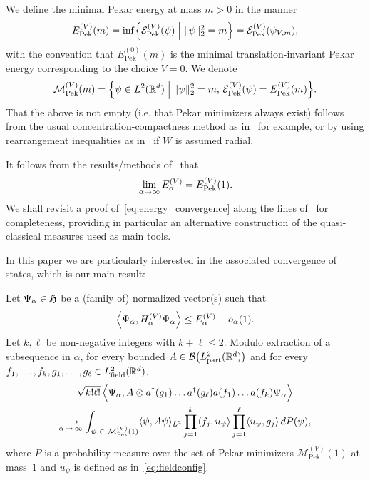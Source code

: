 \documentclass[AHL,Unicode,longabstracts,published]{cedram}
\DeclareMathOperator{\Pek}{Pek}
\DeclareMathOperator{\partt}{part}
\DeclareMathOperator{\field}{field}
\newcommand{\R}{\mathbb{R}}
\newcommand{\gH}{\mathfrak{H}}
\newcommand{\cB}{\mathcal{B}}
\newcommand{\cE}{\mathcal{E}}
\newcommand{\cM}{\mathcal{M}}
\newcommand{\1}{\mathds{1}}
\let\oldin\in
\renewcommand{\in}{\mathchoice{\oldin}{\oldin}{\,\oldin\,}{\,\oldin\,}}
\renewcommand*{\to}{\mathchoice{\longrightarrow}{\rightarrow}{\rightarrow}{\rightarrow}}
\let\originalleft\left
\let\originalright\right
\renewcommand{\left}{\mathopen{}\mathclose\bgroup\originalleft}
\renewcommand{\right}{\aftergroup\egroup\originalright}
\begin{document}
We define the minimal Pekar energy at mass $m >0$ in the manner
\begin{equation}\label{eq:pekar_energy}
E_{\Pek}^{(V)}(m)=\inf\left\{ \cE^{(V)}_{\Pek}(\psi)\;\middle|\;\|\psi\|_{2}^2=m \right\} = \cE_{\Pek}^{(V)}\left(\psi_{V,m} \right),
\end{equation}
with the convention that $E_{\Pek}^{(0)}(m)$ is the minimal translation-invariant Pekar energy corresponding to the choice $V=0$. We denote
\begin{equation}\label{eq:minimizers}
\cM _{\Pek}^{(V)}(m) = \left\{\psi\in L^2 (\R^d)\;\middle|\; \|\psi\|_{2}^2=m,\, \cE_{\Pek}^{(V)}\left(\psi \right) = E_{\Pek}^{(V)}(m) \right\}.
\end{equation}
That the above is not empty (i.e. that Pekar minimizers always exist) follows from the usual concentration-compactness method as in~\cite{FroJonLen-07b,LewRou-13b,Ricaud-14} for example, or by using rearrangement inequalities as in~\cite{Lieb-77} if $W$ is assumed radial.


It follows from the results/methods of~\cite{CorFalOli-20,DonVar-83,LieTho-97} that
\begin{equation}\label{eq:energy_convergence}
\lim_{\alpha\to\infty} E^{(V)}_\alpha =E^{(V)}_{\Pek}(1).
\end{equation}
We shall revisit a proof of~\eqref{eq:energy_convergence} along the lines of~\cite{CorFalOli-20} for completeness, providing in particular an alternative construction of the quasi-classical measures used as main tools.

In this paper we are particularly interested in the associated convergence of states, which is our main result:



\begin{theo}\label{thm:main}
Let $\Psi_\alpha \in \gH$ be a (family of) normalized vector(s) such that
\begin{equation}\label{eq:minimizing_sequence}
\left\langle \Psi_\alpha, H^{(V)}_\alpha\Psi_\alpha\right\rangle\le E^{(V)}_\alpha+o_\alpha(1).
\end{equation}
Let $k,\ell$ be non-negative integers with $k+\ell \leq 2$. Modulo extraction of a subsequence in $\alpha$, for every bounded $A\in \cB\big(L^2_{\partt}(\R^d) \big)$ and for every $f_1,\dots,f_k,g_1,\dots,g_\ell\in L^2_{\field}(\R^d)$,
\begin{multline}\label{eq:mainCV}
\sqrt{k!\ell!}\, \Big\langle \Psi_\alpha, A \otimes a^\dagger(g_1)\dots a^\dagger(g_\ell) a(f_1)\dots a(f_k) \Psi_\alpha \Big \rangle  \\
\underset{\alpha\,\to\,\infty}{\to}\int_{\psi \in \cM _{\Pek}^{(V)}(1)} \langle \psi, A \psi \rangle_{L^2} \prod_{j=1}^k\langle f_j,u_\psi \rangle \prod_{j=1}^\ell\langle u_\psi, g_j\rangle\,dP(\psi),
\end{multline}
where $P$ is a probability measure over the set of Pekar minimizers $\cM _{\Pek}^{(V)}(1)$ at mass~$1$ and $u_\psi$ is defined as in~\eqref{eq:fieldconfig}.
\end{theo}
\end{document}

